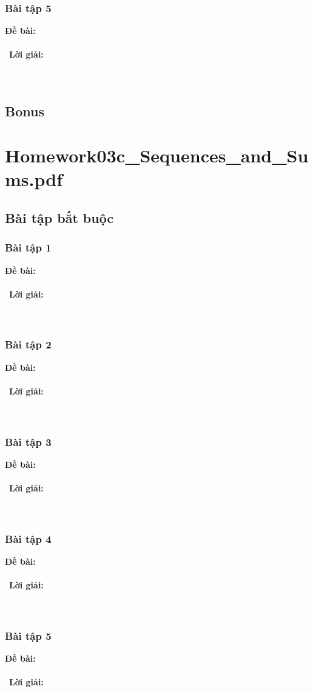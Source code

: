 \documentclass[a4paper]{article}
\begin{document}
\subsubsection{Bài tập 5}
\textbf{Đề bài:} 
\\\ \\\
\textbf{Lời giải:} \\\ \\\
\clearpage

\subsection{Bonus}
\clearpage

\section{Homework03c\_Sequences\_and\_Sums.pdf}
\subsection{Bài tập bắt buộc}
\subsubsection{Bài tập 1}
\textbf{Đề bài:} 
\\\ \\\
\textbf{Lời giải:} \\\ \\\
\clearpage
\subsubsection{Bài tập 2}
\textbf{Đề bài:} 
\\\ \\\
\textbf{Lời giải:} \\\ \\\
\clearpage
\subsubsection{Bài tập 3}
\textbf{Đề bài:} 
\\\ \\\
\textbf{Lời giải:} \\\ \\\
\clearpage
\subsubsection{Bài tập 4}
\textbf{Đề bài:} 
\\\ \\\
\textbf{Lời giải:} \\\ \\\
\clearpage
\subsubsection{Bài tập 5}
\textbf{Đề bài:} 
\\\ \\\
\textbf{Lời giải:} \\\ \\\
\clearpage

\clearpage
\end{document}
